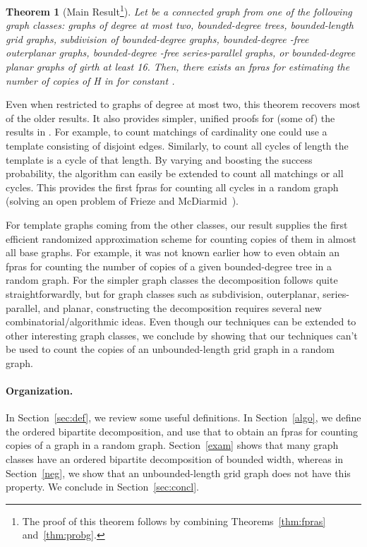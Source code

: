 \documentclass[11pt]{article}
\newtheorem{theorem}{Theorem}[section]
\begin{document}
\begin{theorem} [Main Result\footnote{The proof of this theorem follows by combining Theorems~\ref{thm:fpras} and~\ref{thm:probg}.}] \label{first}
Let  be a connected graph from one of the following graph classes: graphs of degree at most two, bounded-degree trees, bounded-length grid graphs, subdivision of bounded-degree graphs, bounded-degree -free outerplanar graphs,  bounded-degree -free series-parallel graphs, or  bounded-degree planar graphs of girth at least 16. Then,  there exists an fpras for estimating the number of copies of H in  for constant .
\end{theorem} 

Even when restricted to graphs of degree at most two, this theorem recovers most of the older results. It also provides simpler, unified proofs for (some of) the results in \cite{frieze,ras,chien,suen}. For example, to count matchings of cardinality  one could use a template consisting of  disjoint edges. Similarly, to count all cycles of length   the template is a cycle of that length. By varying  and boosting the success probability, the algorithm can easily be extended to count all matchings or all cycles. This provides the first fpras for counting all cycles in a random graph (solving an open problem of Frieze and McDiarmid~\cite{fmc}). 


For template graphs coming from the other classes, our result supplies the first efficient randomized approximation scheme for counting copies of them in almost all base graphs. For example, it was not known earlier how to even obtain an fpras for counting the number of copies of a given bounded-degree tree in a random graph. For the simpler graph classes the decomposition follows quite straightforwardly, but for graph classes such as subdivision, outerplanar, series-parallel, and planar, constructing the decomposition requires several new combinatorial/algorithmic ideas. Even though our techniques can be extended to other interesting graph classes, we conclude by showing that our techniques can't be used to count the copies of an unbounded-length grid graph in a random graph.

\paragraph{Organization.} In Section~\ref{sec:def}, we review some useful definitions. In Section~\ref{algo}, we define the ordered bipartite decomposition, and use that to obtain an  fpras for counting copies of a graph in a random graph. Section~\ref{exam} shows that many graph classes have an ordered bipartite decomposition of bounded width, whereas in Section~\ref{neg}, we show that an unbounded-length grid graph does not have this property.  We conclude in Section~\ref{sec:concl}.
\end{document}
